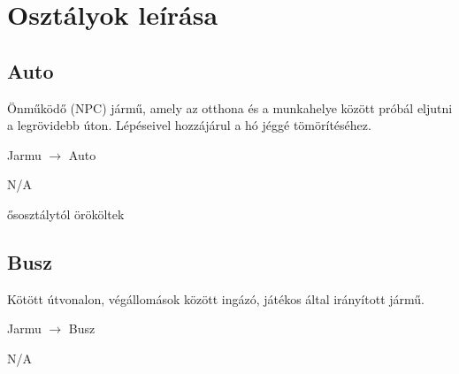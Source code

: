 
\section{Osztályok leírása}

\subsection{Auto}
\begin{class-template-responsibility}
    Önműködő (NPC) jármű, amely az otthona és a munkahelye között próbál eljutni a legrövidebb úton. Lépéseivel hozzájárul a hó jéggé tömörítéséhez.
\end{class-template-responsibility}
\begin{class-template-baseclass}
    Jarmu $\rightarrow$ Auto
\end{class-template-baseclass}
\begin{class-template-interface}
    N/A
\end{class-template-interface}
\begin{class-template-attribute}
\end{class-template-attribute}
\begin{class-template-method}
    ősosztálytól örököltek
\end{class-template-method}

\subsection{Busz}
\begin{class-template-responsibility}
   Kötött útvonalon, végállomások között ingázó, játékos által irányított jármű. 
\end{class-template-responsibility}
\begin{class-template-baseclass}
    Jarmu $\rightarrow$ Busz
\end{class-template-baseclass}
\begin{class-template-interface}
    N/A
\end{class-template-interface}
\begin{class-template-attribute}
\end{class-template-attribute}
\begin{class-template-method}
\end{class-template-method}

